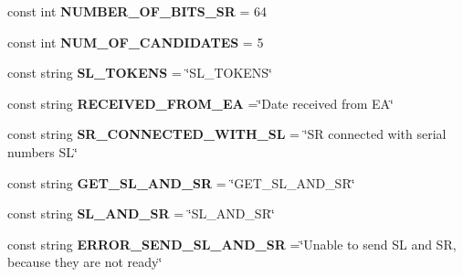 \begin{DoxyCompactItemize}
\item 
\hypertarget{class_proxy_1_1_constants_ab91cbdefa74d077469d3124b50de1bea}{}const int {\bfseries N\+U\+M\+B\+E\+R\+\_\+\+O\+F\+\_\+\+B\+I\+T\+S\+\_\+\+S\+R} = 64\label{class_proxy_1_1_constants_ab91cbdefa74d077469d3124b50de1bea}

\item 
\hypertarget{class_proxy_1_1_constants_a76fe28a28e568b35533c2b2743445d22}{}const int {\bfseries N\+U\+M\+\_\+\+O\+F\+\_\+\+C\+A\+N\+D\+I\+D\+A\+T\+E\+S} = 5\label{class_proxy_1_1_constants_a76fe28a28e568b35533c2b2743445d22}

\item 
\hypertarget{class_proxy_1_1_constants_a7a1b070301ddd87b89db757e8214e4c1}{}const string {\bfseries S\+L\+\_\+\+T\+O\+K\+E\+N\+S} = \char`\"{}S\+L\+\_\+\+T\+O\+K\+E\+N\+S\char`\"{}\label{class_proxy_1_1_constants_a7a1b070301ddd87b89db757e8214e4c1}

\item 
\hypertarget{class_proxy_1_1_constants_a2807d998dc37fe20b0a7a3547061c74d}{}const string {\bfseries R\+E\+C\+E\+I\+V\+E\+D\+\_\+\+F\+R\+O\+M\+\_\+\+E\+A} =\char`\"{}Date received from E\+A\char`\"{}\label{class_proxy_1_1_constants_a2807d998dc37fe20b0a7a3547061c74d}

\item 
\hypertarget{class_proxy_1_1_constants_afc7bf0bf5ef532501cc3a4ecb983292d}{}const string {\bfseries S\+R\+\_\+\+C\+O\+N\+N\+E\+C\+T\+E\+D\+\_\+\+W\+I\+T\+H\+\_\+\+S\+L} = \char`\"{}S\+R connected with serial numbers S\+L\char`\"{}\label{class_proxy_1_1_constants_afc7bf0bf5ef532501cc3a4ecb983292d}

\item 
\hypertarget{class_proxy_1_1_constants_a11aaf73bc27df14b91d68b56a0fcf311}{}const string {\bfseries G\+E\+T\+\_\+\+S\+L\+\_\+\+A\+N\+D\+\_\+\+S\+R} = \char`\"{}G\+E\+T\+\_\+\+S\+L\+\_\+\+A\+N\+D\+\_\+\+S\+R\char`\"{}\label{class_proxy_1_1_constants_a11aaf73bc27df14b91d68b56a0fcf311}

\item 
\hypertarget{class_proxy_1_1_constants_adfb0f2455884821f51c04b0948f8f275}{}const string {\bfseries S\+L\+\_\+\+A\+N\+D\+\_\+\+S\+R} = \char`\"{}S\+L\+\_\+\+A\+N\+D\+\_\+\+S\+R\char`\"{}\label{class_proxy_1_1_constants_adfb0f2455884821f51c04b0948f8f275}

\item 
\hypertarget{class_proxy_1_1_constants_ac08dafba985ff9161e355eb017e5f556}{}const string {\bfseries E\+R\+R\+O\+R\+\_\+\+S\+E\+N\+D\+\_\+\+S\+L\+\_\+\+A\+N\+D\+\_\+\+S\+R} =\char`\"{}Unable to send S\+L and S\+R, because they are not ready\char`\"{}\label{class_proxy_1_1_constants_ac08dafba985ff9161e355eb017e5f556}


\end{DoxyCompactItemize}
